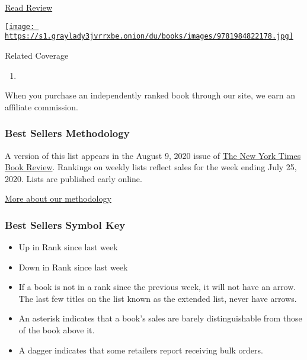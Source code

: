 \begin{enumerate}
  \href{https://www.nytimes3xbfgragh.onion/2019/04/08/books/review-normal-people-sally-rooney.html}{Read
  Review}

  \href{https://www.nytimes3xbfgragh.onion/2019/04/08/books/review-normal-people-sally-rooney.html}{\texttt{[image: https://s1.graylady3jvrrxbe.onion/du/books/images/9781984822178.jpg]}}
\end{enumerate}

Related Coverage

\begin{enumerate}
\def\labelenumi{\arabic{enumi}.}
\tightlist
\item
  \href{https://www.nytimes3xbfgragh.onion/2020/07/31/books/review/the-system-robert-reich-break-em-up-zephyr-teachout.html}{}
\end{enumerate}

When you purchase an independently ranked book through our site, we earn
an affiliate commission.

\hypertarget{best-sellers-methodology}{%
\subsubsection{Best Sellers
Methodology}\label{best-sellers-methodology}}

A version of this list appears in the August 9, 2020 issue of
\href{http://www.nytimes3xbfgragh.onion/section/books/review}{The New
York Times Book Review}. Rankings on weekly lists reflect sales for the
week ending July 25, 2020. Lists are published early online.

\href{/books/best-sellers/methodology/}{More about our methodology}

\hypertarget{best-sellers-symbol-key}{%
\subsubsection{Best Sellers Symbol Key}\label{best-sellers-symbol-key}}

\begin{itemize}
\item
  Up in Rank since last week
\item
  Down in Rank since last week
\item
  If a book is not in a rank since the previous week, it will not have
  an arrow. The last few titles on the list known as the extended list,
  never have arrows.
\item
  An asterisk indicates that a book's sales are barely distinguishable
  from those of the book above it.
\item
  A dagger indicates that some retailers report receiving bulk orders.
\end{itemize}

